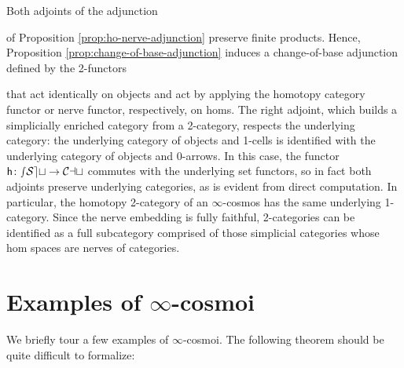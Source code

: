\begin{example}\label{ex:nerve-ho-change-of-base}
Both adjoints of the adjunction
\begin{center}
\end{center} of Proposition \ref{prop:ho-nerve-adjunction} preserve finite products. Hence, Proposition \ref{prop:change-of-base-adjunction} induces a change-of-base adjunction defined by the 2-functors
\begin{center}
\end{center}
that act identically on objects and act by applying the homotopy category functor or nerve functor, respectively, on homs. %
  The right adjoint, which builds a simplicially enriched category from a 2-category, respects the underlying category: the underlying category of objects and 1-cells is identified with the underlying category of objects and 0-arrows. In this case, the functor ${\mathord{\mathsf{h}}} \colon {\mathord{\mathcal{sSet}}} \to {\mathord{\mathcal{Cat}}}$ commutes with the underlying set functors, so in fact both adjoints preserve underlying categories, as is evident from direct computation. In particular, the homotopy 2-category of an $\infty$-cosmos has the same underlying 1-category. Since the nerve embedding is fully faithful, 2-categories can be identified as a full subcategory comprised of those simplicial categories whose hom spaces are nerves of categories.
\end{example}

\section{Examples of \texorpdfstring{$\infty$}{infinity}-cosmoi}\label{sec:examples}

We briefly tour a few examples of $\infty$-cosmoi. %
The following theorem should be quite difficult to formalize:

